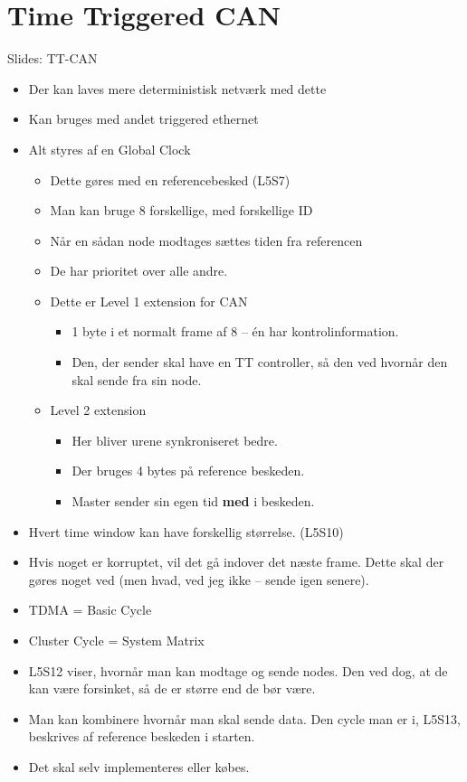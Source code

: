 \documentclass[oneside, 10pt]{article}
\begin{document}
\section{Time Triggered CAN}
Slides: TT-CAN
\begin{itemize}
	\item Der kan laves mere deterministisk netværk med dette
	\item Kan bruges med andet triggered ethernet
	\item Alt styres af en Global Clock
	\begin{itemize}
		\item Dette gøres med en referencebesked (L5S7)
		\item Man kan bruge 8 forskellige, med forskellige ID
		\item Når en sådan node modtages sættes tiden fra referencen
		\item De har prioritet over alle andre.
		\item Dette er Level 1 extension for CAN
		\begin{itemize}
			\item 1 byte i et normalt frame af 8 -- én har kontrolinformation.
			\item Den, der sender skal have en TT controller, så den ved hvornår den skal sende fra sin node.
		\end{itemize}


		\item Level 2 extension
		\begin{itemize}
			\item Her bliver urene synkroniseret bedre.
			\item Der bruges 4 bytes på reference beskeden.
			\item Master sender sin egen tid \textbf{med} i beskeden.
		\end{itemize}
	\end{itemize}

	\item Hvert time window kan have forskellig størrelse. (L5S10)
	\item Hvis noget er korruptet, vil det gå indover det næste frame. Dette skal der gøres noget ved (men hvad, ved jeg ikke -- sende igen senere).
	\item TDMA = Basic Cycle
	\item Cluster Cycle = System Matrix
	\item L5S12 viser, hvornår man kan modtage og sende nodes. Den ved dog, at de kan være forsinket, så de er større end de bør være.

	\item Man kan kombinere hvornår man skal sende data. Den cycle man er i, L5S13, beskrives af reference beskeden i starten.

	\item Det skal selv implementeres eller købes.
\end{itemize}
\end{document}
